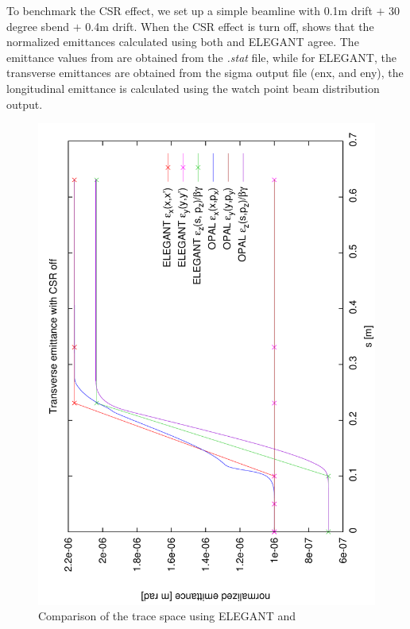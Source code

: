 To benchmark the CSR effect, we set up a simple beamline with 0.1m drift $+$ 30 degree sbend $+$ 0.4m drift. When the CSR effect is turn off,  shows that the normalized emittances calculated using both \opal and ELEGANT agree. The emittance values from \opal are obtained from the {\it .stat} file, while for ELEGANT, the transverse emittances are obtained from the sigma output file (enx, and eny), the longitudinal emittance is calculated using the watch point beam distribution output.
\begin{figure}[!htb]
\centering
\includegraphics[height=0.5\textwidth-0.6cm, angle = -90, trim = 3mm 0mm 2mm 0mm, clip]{figures/Benchmarks/emit-csr-off}
\caption{Comparison of the trace space using ELEGANT and \opal}
\label{fig:plot-emit-csr-off}
\end{figure}

